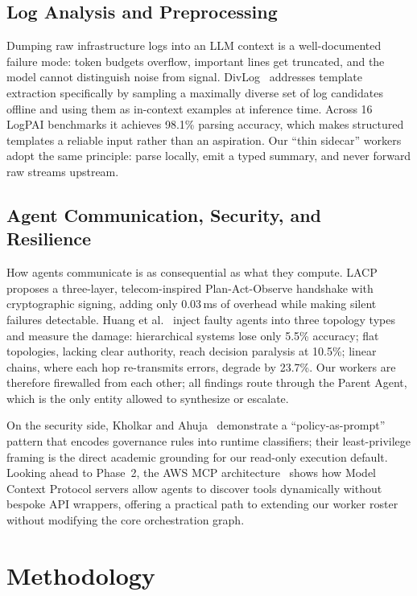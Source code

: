 \documentclass[conference]{IEEEtran}
\begin{document}
\subsection{Log Analysis and Preprocessing}
Dumping raw infrastructure logs into an LLM context is a well-documented failure mode: token
budgets overflow, important lines get truncated, and the model cannot distinguish noise from
signal. DivLog~\cite{xu2024divlog} addresses template extraction specifically by sampling a
maximally diverse set of log candidates offline and using them as in-context
examples at inference time. Across 16 LogPAI benchmarks it achieves 98.1\% parsing accuracy,
which makes structured templates a reliable input rather than an aspiration. Our ``thin
sidecar'' workers adopt the same principle: parse locally, emit a typed summary, and never
forward raw streams upstream.

\subsection{Agent Communication, Security, and Resilience}
How agents communicate is as consequential as what they compute. LACP~\cite{li2025lacp}
proposes a three-layer, telecom-inspired Plan-Act-Observe handshake with cryptographic
signing, adding only 0.03\,ms of overhead while making silent failures detectable. Huang
et al.~\cite{huang2024resilience} inject faulty agents into three topology types and measure
the damage: hierarchical systems lose only 5.5\% accuracy; flat topologies, lacking clear
authority, reach decision paralysis at 10.5\%; linear chains, where each hop re-transmits
errors, degrade by 23.7\%. Our workers are therefore firewalled from each other; all
findings route through the Parent Agent, which is the only entity allowed to synthesize or
escalate.

On the security side, Kholkar and Ahuja~\cite{kholkar2025safeops} demonstrate a
``policy-as-prompt'' pattern that encodes governance rules into runtime classifiers; their
least-privilege framing is the direct academic grounding for our read-only execution default.
Looking ahead to Phase~2, the AWS MCP architecture~\cite{aws2025mcp_sre} shows how Model
Context Protocol servers allow agents to discover tools dynamically without bespoke API
wrappers, offering a practical path to extending our worker roster without modifying the core
orchestration graph.


\section{Methodology}
\end{document}
